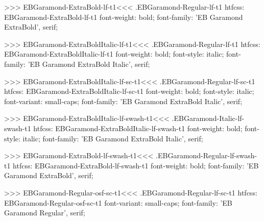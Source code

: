 {{{{{{{>>>
\<EBGaramond-ExtraBold-lf-t1\><<<
.EBGaramond-Regular-lf-t1
htfcss:  EBGaramond-ExtraBold-lf-t1  font-weight: bold; font-family: 'EB Garamond ExtraBold', serif;

>>>
\<EBGaramond-ExtraBoldItalic-lf-t1\><<<
.EBGaramond-Regular-lf-t1
htfcss:  EBGaramond-ExtraBoldItalic-lf-t1  font-weight: bold; font-style: italic; font-family: 'EB Garamond ExtraBold Italic', serif;

>>>
\<EBGaramond-ExtraBoldItalic-lf-sc-t1\><<<
.EBGaramond-Regular-lf-sc-t1
htfcss:  EBGaramond-ExtraBoldItalic-lf-sc-t1  font-weight: bold; font-style: italic; font-variant: small-caps; font-family: 'EB Garamond ExtraBold Italic', serif;

>>>
\<EBGaramond-ExtraBoldItalic-lf-swash-t1\><<<
.EBGaramond-Italic-lf-swash-t1
htfcss:  EBGaramond-ExtraBoldItalic-lf-swash-t1  font-weight: bold; font-style: italic; font-family: 'EB Garamond ExtraBold Italic', serif;

>>>
\<EBGaramond-ExtraBold-lf-swash-t1\><<<
.EBGaramond-Regular-lf-swash-t1
htfcss:  EBGaramond-ExtraBold-lf-swash-t1  font-weight: bold; font-family: 'EB Garamond ExtraBold', serif;

>>>
\<EBGaramond-Regular-osf-sc-t1\><<<
.EBGaramond-Regular-lf-sc-t1
htfcss:  EBGaramond-Regular-osf-sc-t1  font-variant: small-caps; font-family: 'EB Garamond Regular', serif;

}}}}}}}
